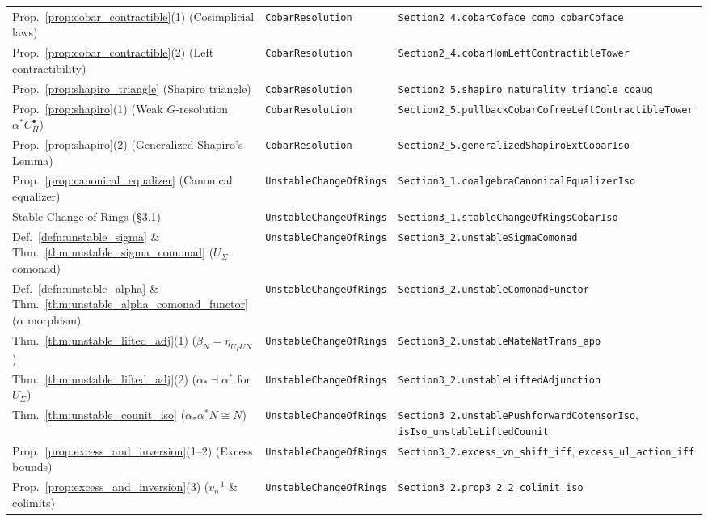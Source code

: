 \documentclass[11pt,reqno]{amsart}
\theoremstyle{plain}
\theoremstyle{definition}
\begin{document}
{\begin{longtable}{@{}p{}p{}p{}@{}}
Prop.~\ref{prop:cobar_contractible}(1) (Cosimplicial laws) & \texttt{CobarResolution} & \texttt{Section2\_4.cobarCoface\_comp\_cobarCoface} \\
Prop.~\ref{prop:cobar_contractible}(2) (Left contractibility) & \texttt{CobarResolution} & \texttt{Section2\_4.cobarHomLeftContractibleTower} \\
Prop.~\ref{prop:shapiro_triangle} (Shapiro triangle) & \texttt{CobarResolution} & \texttt{Section2\_5.shapiro\_naturality\_triangle\_coaug} \\
Prop.~\ref{prop:shapiro}(1) (Weak $G$-resolution $\alpha^* C^{\bullet}_H$) & \texttt{CobarResolution} & \texttt{Section2\_5.pullbackCobarCofreeLeftContractibleTower} \\
Prop.~\ref{prop:shapiro}(2) (Generalized Shapiro's Lemma) & \texttt{CobarResolution} & \texttt{Section2\_5.generalizedShapiroExtCobarIso} \\
Prop.~\ref{prop:canonical_equalizer} (Canonical equalizer) & \texttt{UnstableChangeOfRings} & \texttt{Section3\_1.coalgebraCanonicalEqualizerIso} \\
Stable Change of Rings (\S3.1) & \texttt{UnstableChangeOfRings} & \texttt{Section3\_1.stableChangeOfRingsCobarIso} \\
Def.~\ref{defn:unstable_sigma} \& Thm.~\ref{thm:unstable_sigma_comonad} ($U_{\Sigma}$ comonad) & \texttt{UnstableChangeOfRings} & \texttt{Section3\_2.unstableSigmaComonad} \\
Def.~\ref{defn:unstable_alpha} \& Thm.~\ref{thm:unstable_alpha_comonad_functor} ($\alpha$ morphism) & \texttt{UnstableChangeOfRings} & \texttt{Section3\_2.unstableComonadFunctor} \\
Thm.~\ref{thm:unstable_lifted_adj}(1) ($\beta_N = \eta_{U_{\Gamma} UN}$) & \texttt{UnstableChangeOfRings} & \texttt{Section3\_2.unstableMateNatTrans\_app} \\
Thm.~\ref{thm:unstable_lifted_adj}(2) ($\alpha_* \dashv \alpha^*$ for $U_{\Sigma}$) & \texttt{UnstableChangeOfRings} & \texttt{Section3\_2.unstableLiftedAdjunction} \\
Thm.~\ref{thm:unstable_counit_iso} ($\alpha_*\alpha^* N \cong N$) & \texttt{UnstableChangeOfRings} & \texttt{Section3\_2.unstablePushforwardCotensorIso}, \texttt{isIso\_unstableLiftedCounit} \\
Prop.~\ref{prop:excess_and_inversion}(1--2) (Excess bounds) & \texttt{UnstableChangeOfRings} & \texttt{Section3\_2.excess\_vn\_shift\_iff}, \texttt{excess\_ul\_action\_iff} \\
Prop.~\ref{prop:excess_and_inversion}(3) ($v_n^{-1}$ \& colimits) & \texttt{UnstableChangeOfRings} & \texttt{Section3\_2.prop3\_2\_2\_colimit\_iso} \\

\end{longtable}}
\end{document}
